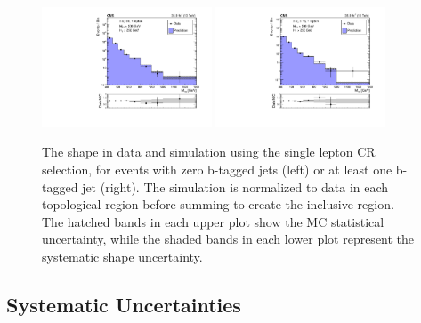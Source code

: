 \begin{figure}
	\centering
	\includegraphics[width=0.45\textwidth]{backgrounds/figs/lostlepHybrid_0b_mt2bins.pdf}
	\includegraphics[width=0.45\textwidth]{backgrounds/figs/lostlepHybrid_ge1b_mt2bins}
	\caption{The \mttwo shape in data and simulation using the single lepton CR selection, for events with zero b-tagged jets (left) or at least one b-tagged jet (right). The simulation is normalized to data in each topological region before summing to create the inclusive region. The hatched bands in each upper plot show the MC statistical uncertainty, while the shaded bands in each lower plot represent the systematic shape uncertainty.}
	\label{fig:lostlepHybrid}
\end{figure}

\subsection{Systematic Uncertainties}
\label{subsec:lostlepSyst}

